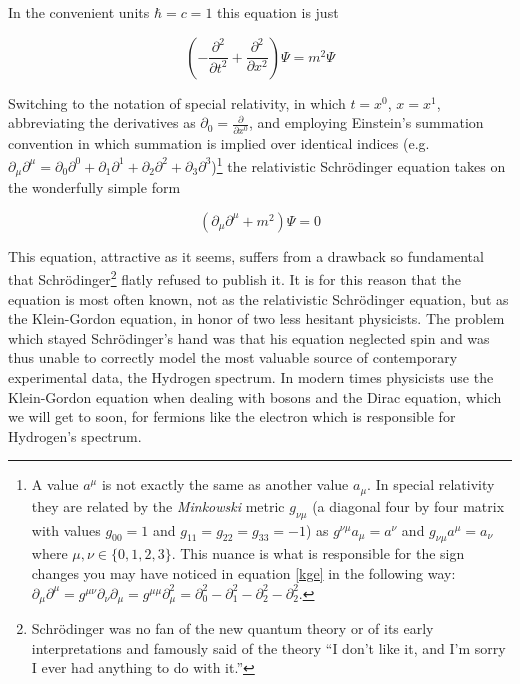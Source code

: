 \documentclass[12pt]{book}
\begin{document}
In the convenient units $\hbar=c=1$ this equation is just

\begin{equation}
\left(-\frac{\partial^{2}}{\partial t^{2}}+\frac{\partial^{2}}{\partial x^{2}}\right)\Psi=m^{2}\Psi 
\end{equation}

Switching to the notation of special relativity, in which $t=x^{0}$, $x=x^{1}$, abbreviating the derivatives as $\partial_{0}=\frac{\partial}{\partial x^{0}}$, and employing Einstein's summation convention in which summation is implied over identical indices (e.g. $\partial_{\mu}\partial^{\mu}=\partial_{0}\partial^{0}+\partial_{1}\partial^{1}+\partial_{2}\partial^{2}+\partial_{3}\partial^{3}$)\footnote{A value $a^{\mu}$ is not exactly the same as another value $a_{\mu}$. In special relativity they are related by the \textit{Minkowski} metric $g_{\nu \mu}$ (a diagonal four by four matrix with values $g_{00}=1$ and $g_{11}=g_{22}=g_{33}=-1$) as $g^{\nu \mu}a_{\mu}=a^{\nu}$ and $g_{\nu \mu}a^{\mu}=a_{\nu}$ where $\mu, \nu \in \{0,1,2,3\}$. This nuance is what is responsible for the sign changes you may have noticed in equation \ref{kge} in the following way: $\partial_{\mu}\partial^{\mu}=g^{\mu \nu}\partial_{\nu}\partial_{\mu}=g^{\mu \mu}\partial_{\mu}^{2}=\partial_{0}^{2}-\partial_{1}^{2}-\partial_{2}^{2}-\partial_{2}^{2}$.} the relativistic Schr\"{o}dinger equation takes on the wonderfully simple form

\begin{equation}\label{kge}
 (\partial_{\mu}\partial^{\mu}+m^{2})\Psi=0
\end{equation}

This equation, attractive as it seems, suffers from a drawback so fundamental that Schr\"{o}dinger\footnote{Schr\"{o}dinger was no fan of the new quantum theory or of its early interpretations and famously said of the theory ``I don't like it, and I'm sorry I ever had anything to do with it.''} flatly refused to publish it. It is for this reason that the equation is most often known, not as the relativistic Schr\"{o}dinger equation, but as the Klein-Gordon equation, in honor of two less hesitant physicists. The problem which stayed Schr\"{o}dinger's hand was that his equation neglected spin and was thus unable to correctly model the most valuable source of contemporary experimental data, the Hydrogen spectrum. In modern times physicists use the Klein-Gordon equation when dealing with bosons and the Dirac equation, which we will get to soon, for fermions like the electron which is responsible for Hydrogen's spectrum.
\end{document}
